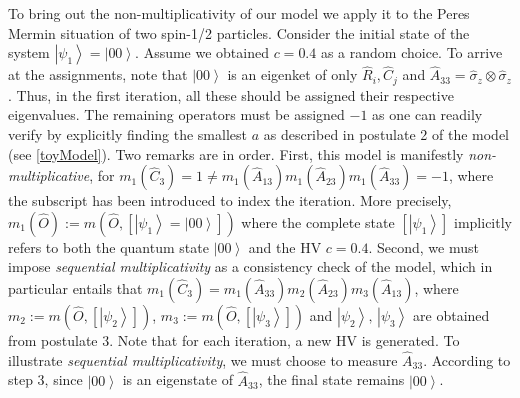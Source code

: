 \documentclass[british,aps,prl,superscriptaddress,nofootinbib,times,reprint]{revtex4-1}
\theoremstyle{plain}
\theoremstyle{definition}
\theoremstyle{remark}
\theoremstyle{plain}
\theoremstyle{plain}
\theoremstyle{plain}
\theoremstyle{definition}
\theoremstyle{definition}
\begin{document}
To bring out the non-multiplicativity of our model
we apply it to the Peres Mermin situation of two
spin-1/2 particles. Consider the initial state of
the system 
$\left|\psi_{1}\right\rangle
=\left|00\right\rangle $. Assume we 
obtained $c=0.4$ as a random choice. To arrive
at the assignments, note that
$\left|00\right\rangle $ is an eigenket of only
$\hat{R}_{i},\hat{C}_{j}$ and
$\hat{A}_{33}=\hat{\sigma}_{z}\otimes\hat{\sigma}_{z}$.
Thus, in the first iteration, all these should be
assigned their respective eigenvalues. The
remaining operators must be assigned $-1$ as one
can readily verify by explicitly finding the
smallest $a$ as described in postulate 2 of the
model (see \eqref{toyModel}). Two remarks are in
order. First, this model is manifestly
\emph{non-multiplicative}, for
$m_{1}(\hat{C}_{3})=1\neq
m_{1}(\hat{A}_{13})m_{1}(\hat{A}_{23})m_{1}(\hat{A}_{33})=-1$,
where the subscript has been introduced to index
the iteration. More precisely,
$m_{1}(\hat{O}):=m(\hat{O},\left[\left|\psi_{1}\right\rangle
=\left|00\right\rangle \right])$ where the
complete state $\left[\left|\psi_{1}\right\rangle
\right]$ implicitly refers to both the quantum
state $\left|00\right\rangle $ and the HV $c=0.4$.
Second, we must impose \emph{sequential
multiplicativity} as a consistency check of the
model, which in particular entails that
$m_{1}(\hat{C}_{3})=m_{1}(\hat{A}_{33})m_{2}(\hat{A}_{23})m_{3}(\hat{A}_{13})$,
where
$m_{2}:=m(\hat{O},\left[\left|\psi_{2}\right\rangle
\right])$,
$m_{3}:=m(\hat{O},\left[\left|\psi_{3}\right\rangle
\right])$ and $\left|\psi_{2}\right\rangle
,\,\left|\psi_{3}\right\rangle $ are obtained from
postulate 3. Note that for each iteration, a new
HV is generated. To illustrate \emph{sequential
multiplicativity}, we must choose to measure
$\hat{A}_{33}$. According to step 3, since
$\left|00\right\rangle $ is an eigenstate of
$\hat{A}_{33}$, the final state remains
$\left|00\right\rangle $.  
\end{document}
